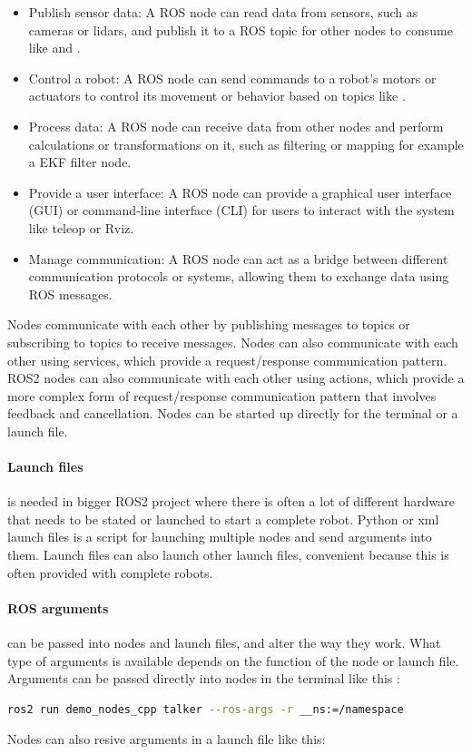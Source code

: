 \begin{itemize}
    \item Publish sensor data: A ROS node can read data from sensors, such as cameras or lidars, and publish it to a ROS topic for other nodes to consume like  and .
    
    \item Control a robot: A ROS node can send commands to a robot's motors or actuators to control its movement or behavior based on topics like .
    
    \item Process data: A ROS node can receive data from other nodes and perform calculations or transformations on it, such as filtering or mapping for example a EKF filter node.
    
    \item Provide a user interface: A ROS node can provide a graphical user interface (GUI) or command-line interface (CLI) for users to interact with the system like teleop or Rviz.
    
    \item Manage communication: A ROS node can act as a bridge between different communication protocols or systems, allowing them to exchange data using ROS messages.
    
\end{itemize}

Nodes communicate with each other by publishing messages to topics or subscribing to topics to receive messages. Nodes can also communicate with each other using services, which provide a request/response communication pattern. ROS2 nodes can also communicate with each other using actions, which provide a more complex form of request/response communication pattern that involves feedback and cancellation. Nodes can be started up directly for the terminal or a launch file. 

\paragraph{Launch files} is needed in bigger ROS2 project where there is often a lot of different hardware that needs to be stated or launched to start a complete robot. Python or xml launch files is a script for launching multiple nodes and send arguments into them. Launch files can also launch other launch files, convenient because this is often provided with complete robots. 

\paragraph{ROS arguments} can be passed into nodes and launch files, and alter the way they work. What type of arguments is available depends on the function of the node or launch file. Arguments can be passed directly into nodes in the terminal like this : 
\begin{lstlisting}[language=bash]
  ros2 run demo_nodes_cpp talker --ros-args -r __ns:=/namespace
\end{lstlisting}
Nodes can also resive arguments in a launch file like this: 


